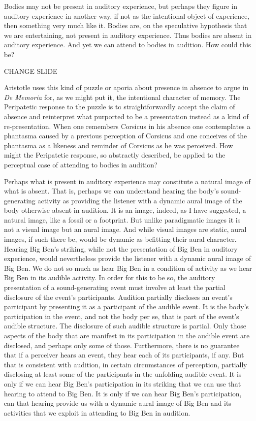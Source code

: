 \documentclass[12pt]{article}
\begin{document}
Bodies may not be present in auditory experience, but perhaps they figure in auditory experience in another way, if not as the intentional object of experience, then something very much like it. Bodies are, on the speculative hypothesis that we are entertaining, not present in auditory experience. Thus bodies are absent in auditory experience. And yet we can attend to bodies in audition. How could this be?

CHANGE SLIDE

Aristotle uses this kind of puzzle or aporia about presence in absence to argue in \emph{De Memoria} for, as we might put it, the intentional character of memory. The Peripatetic response to the puzzle is to straightforwardly accept the claim of absence and reinterpret what purported to be a presentation instead as a kind of re-presentation. When one remembers Corsicus in his absence one contemplates a phantasma caused by a previous perception of Corsicus and one conceives of the phantasma as a likeness and reminder of Corsicus as he was perceived. How might the Peripatetic response, so abstractly described, be applied to the perceptual case of attending to bodies in audition?

Perhaps what is present in auditory experience may constitute a natural image of what is absent. That is, perhaps we can understand hearing the body’s sound-generating activity as providing the listener with a dynamic aural image of the body otherwise absent in audition. It is an image, indeed, as I have suggested, a natural image, like a fossil or a footprint. But unlike paradigmatic images it is not a visual image but an aural image. And while visual images are static, aural images, if such there be, would be dynamic as befitting their aural character. Hearing Big Ben’s striking, while not the presentation of Big Ben in auditory experience, would nevertheless provide the listener with a dynamic aural image of Big Ben. We do not so much as hear Big Ben in a condition of activity as we hear Big Ben in its audible activity. In order for this to be so, the auditory presentation of a sound-generating event must involve at least the partial disclosure of the event’s participants. Audition partially discloses an event’s participant by presenting it as a participant of the audible event. It is the body’s participation in the event, and not the body per se, that is part of the event’s audible structure. The disclosure of such audible structure is partial. Only those aspects of the body that are manifest in its participation in the audible event are disclosed, and perhaps only some of those. Furthermore, there is no guarantee that if a perceiver hears an event, they hear each of its participants, if any. But that is consistent with audition, in certain circumstances of perception, partially disclosing at least some of the participants in the unfolding audible event. It is only if we can hear Big Ben’s participation in its striking that we can use that hearing to attend to Big Ben. It is only if we can hear Big Ben’s participation, can that hearing provide us with a dynamic aural image of Big Ben and its activities that we exploit in attending to Big Ben in audition.
\end{document}
